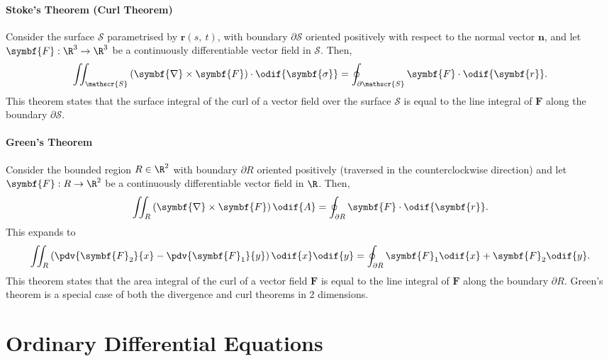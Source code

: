 \documentclass{article}
\begin{document}
\subsection{Stoke's Theorem (Curl Theorem)}
Consider the surface \(\mathscr{S}\) parametrised by \(\symbf{r}\left(
s,\: t \right)\), with boundary \(\partial \mathscr{S}\) oriented
positively with respect to the normal vector \(\symbf{n}\), and let
\(\symbf{F}:\R^3 \to \R^3\) be a continuously differentiable vector
field in \(\mathscr{S}\). Then,
\begin{equation*}
    \iint_{\mathscr{S}} \left( \symbf{\nabla} \times \symbf{F} \right) \cdot \odif{\symbf{\sigma}} = \oint_{\partial \mathscr{S}} \symbf{F} \cdot \odif{\symbf{r}}.
\end{equation*}
This theorem states that the surface integral of the curl of a vector
field over the surface \(\mathscr{S}\) is equal to the line integral of
\(\symbf{F}\) along the boundary \(\partial \mathscr{S}\).
\subsection{Green's Theorem}
Consider the bounded region \(R \in \R^2\) with boundary \(\partial R\)
oriented positively (traversed in the counterclockwise direction) and
let \(\symbf{F}:R \to \R^2\) be a continuously differentiable vector
field in \(\R\). Then,
\begin{equation*}
    \iint_R \left( \symbf{\nabla} \times \symbf{F} \right) \odif{A} = \oint_{\partial R} \symbf{F} \cdot \odif{\symbf{r}}.
\end{equation*}
This expands to
\begin{equation*}
    \iint_R \left( \pdv{\symbf{F}_2}{x} - \pdv{\symbf{F}_1}{y} \right) \odif{x} \odif{y} = \oint_{\partial R} \symbf{F}_1 \odif{x} + \symbf{F}_2 \odif{y}.
\end{equation*}
This theorem states that the area integral of the curl of a vector field
\(\symbf{F}\) is equal to the line integral of \(\symbf{F}\) along the
boundary \(\partial R\). Green's theorem is a special case of both the
divergence and curl theorems in 2 dimensions.
\part{Ordinary Differential Equations}
\end{document}
